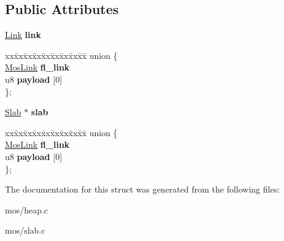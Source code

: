 \subsection*{Public Attributes}
\begin{DoxyCompactItemize}
\item 
\mbox{\label{structBlock_a9ac7db4278f6f2be4940e4c8ab54babc}} 
\hyperlink{structLink}{Link} {\bfseries link}
\item 
\mbox{\label{structBlock_abd410ea4590f9f56115513a10591ba88}} 
\begin{tabbing}
xx\=xx\=xx\=xx\=xx\=xx\=xx\=xx\=xx\=\kill
union \{\\
\>\hyperlink{structMosList}{MosLink} {\bfseries fl\_link}\\
\>u8 {\bfseries payload} \mbox{[}0\mbox{]}\\
\}; \\

\end{tabbing}\item 
\mbox{\label{structBlock_a1df2961842ddce4cf14a113b3b73f15d}} 
\hyperlink{structSlab}{Slab} $\ast$ {\bfseries slab}
\item 
\mbox{\label{structBlock_a706059cece3f83de8fde1340632aa5eb}} 
\begin{tabbing}
xx\=xx\=xx\=xx\=xx\=xx\=xx\=xx\=xx\=\kill
union \{\\
\>\hyperlink{structMosList}{MosLink} {\bfseries fl\_link}\\
\>u8 {\bfseries payload} \mbox{[}0\mbox{]}\\
\}; \\

\end{tabbing}\end{DoxyCompactItemize}


The documentation for this struct was generated from the following files\+:\begin{DoxyCompactItemize}
\item 
mos/heap.\+c\item 
mos/slab.\+c\end{DoxyCompactItemize}
